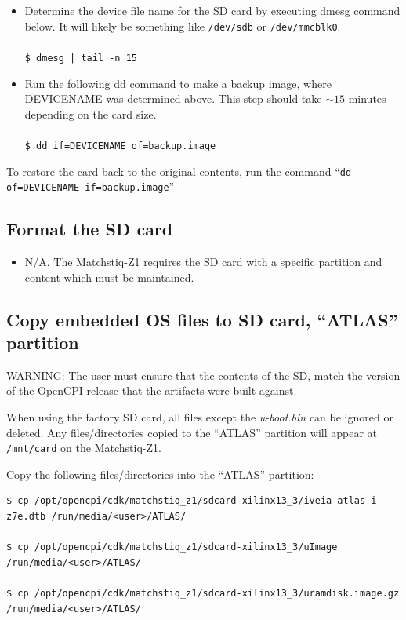 \begin{itemize}
\item Determine the device file name for the SD card by executing dmesg command below. It will likely be something like \texttt{/dev/sdb} or \texttt{/dev/mmcblk0}.\\ \\
\texttt{\$ dmesg | tail -n 15} \\
\item Run the following dd command to make a backup image, where DEVICENAME was determined above. This step should take $\sim15$ minutes depending on the card size.\\ \\
\texttt{\$ dd if=DEVICENAME of=backup.image}
\end{itemize}
\noindent To restore the card back to the original contents, run the command ``\texttt{dd of=DEVICENAME if=backup.image}''

\subsection{Format the SD card}
\begin{itemize}
\item N/A. The Matchstiq-Z1 requires the SD card with a specific partition and content which must be maintained.
\end{itemize}

\subsection{Copy embedded OS files to SD card, ``ATLAS'' partition}
\label{sec:Copy embedded OS to SD card}
\begin{flushleft}

WARNING: The user must ensure that the contents of the SD, match the version of the OpenCPI release that the artifacts were built against.\\ \medskip

When using the factory SD card, all files except the \textit{u-boot.bin} can be ignored or deleted. Any files/directories copied to the ``ATLAS'' partition will appear at \texttt{/mnt/card} on the Matchstiq-Z1.\\ \medskip

Copy the following files/directories into the ``ATLAS'' partition:
\begin{verbatim}
$ cp /opt/opencpi/cdk/matchstiq_z1/sdcard-xilinx13_3/iveia-atlas-i-z7e.dtb /run/media/<user>/ATLAS/

$ cp /opt/opencpi/cdk/matchstiq_z1/sdcard-xilinx13_3/uImage /run/media/<user>/ATLAS/

$ cp /opt/opencpi/cdk/matchstiq_z1/sdcard-xilinx13_3/uramdisk.image.gz /run/media/<user>/ATLAS/
\end{verbatim}\medskip
\end{flushleft}

